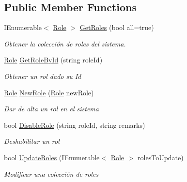 \subsection*{Public Member Functions}
\begin{DoxyCompactItemize}
\item 
I\+Enumerable$<$ \hyperlink{class_h_k_supply_1_1_models_1_1_role}{Role} $>$ \hyperlink{class_h_k_supply_1_1_services_1_1_implementations_1_1_e_f_role_a7fd2f7f9bae498128f23ad0659e3ec4a}{Get\+Roles} (bool all=true)
\begin{DoxyCompactList}\small\item\em Obtener la colección de roles del sistema. \end{DoxyCompactList}\item 
\hyperlink{class_h_k_supply_1_1_models_1_1_role}{Role} \hyperlink{class_h_k_supply_1_1_services_1_1_implementations_1_1_e_f_role_ad4eb9194531a9215c4f1a20ab0d9aa54}{Get\+Role\+By\+Id} (string role\+Id)
\begin{DoxyCompactList}\small\item\em Obtener un rol dado su Id \end{DoxyCompactList}\item 
\hyperlink{class_h_k_supply_1_1_models_1_1_role}{Role} \hyperlink{class_h_k_supply_1_1_services_1_1_implementations_1_1_e_f_role_a549317ad8c8fb3353382a8cd36fa1b22}{New\+Role} (\hyperlink{class_h_k_supply_1_1_models_1_1_role}{Role} new\+Role)
\begin{DoxyCompactList}\small\item\em Dar de alta un rol en el sistema \end{DoxyCompactList}\item 
bool \hyperlink{class_h_k_supply_1_1_services_1_1_implementations_1_1_e_f_role_adf253e840ea77e23fd7c10899f316f21}{Disable\+Role} (string role\+Id, string remarks)
\begin{DoxyCompactList}\small\item\em Deshabilitar un rol \end{DoxyCompactList}\item 
bool \hyperlink{class_h_k_supply_1_1_services_1_1_implementations_1_1_e_f_role_a2d880fce95c33f7581f2e3310ca943ed}{Update\+Roles} (I\+Enumerable$<$ \hyperlink{class_h_k_supply_1_1_models_1_1_role}{Role} $>$ roles\+To\+Update)
\begin{DoxyCompactList}\small\item\em Modificar una colección de roles \end{DoxyCompactList}\end{DoxyCompactItemize}


